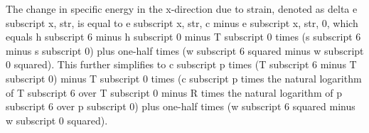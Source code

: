 The change in specific energy in the x-direction due to strain, denoted as delta e subscript x, str, is equal to e subscript x, str, c minus e subscript x, str, 0, which equals h subscript 6 minus h subscript 0 minus T subscript 0 times (s subscript 6 minus s subscript 0) plus one-half times (w subscript 6 squared minus w subscript 0 squared). This further simplifies to c subscript p times (T subscript 6 minus T subscript 0) minus T subscript 0 times (c subscript p times the natural logarithm of T subscript 6 over T subscript 0 minus R times the natural logarithm of p subscript 6 over p subscript 0) plus one-half times (w subscript 6 squared minus w subscript 0 squared).